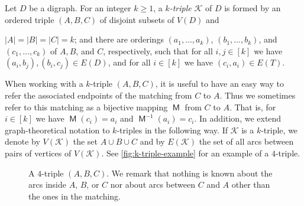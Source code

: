 \documentclass[a4paper,UKenglish,cleveref, autoref, thm-restate]{lipics-v2021}
\DeclareMathOperator{\Mat}{\mathsf M}
\begin{document}
\begin{definition}[$k$-triple]\label{def:k-triple}
  Let $D$ be a digraph. For an integer $k \geq 1$, a \emph{$k$-triple} $\mathcal{K}$ of $D$ is formed by an
  ordered triple $(A, B, C)$  of disjoint subsets of $V(D)$ and
  \begin{outline}
    \1 $|A| = |B| = |C| = k$; and
    \1  there are orderings $(a_1, \ldots, a_k)$, $(b_1, \ldots, b_k)$, and $(c_1,
    \ldots, c_k)$ of $A,B$, and $C$, respectively, such that
    \2 for all  $i,j \in [k]$ we have $(a_i,b_j), (b_i,c_j) \in E(D)$, and
    \2 for all $i \in [k]$ we have $(c_i, a_i) \in E(T)$.
  \end{outline}
\end{definition}
When working with a $k$-triple $(A,B,C)$,  it is useful to have an easy way
to refer the associated endpoints of the matching from $C$ to $A$.
Thus we sometimes refer to this matching as a bijective mapping $\Mat$ from $C$
to $A$.
That is, for $i \in [k]$ we have $\Mat(c_i) = a_i$ and $\Mat^{-1}(a_i) = c_i$.
In addition, we extend graph-theoretical notation to $k$-triples in the
following way.
If $\mathcal{K}$ is a $k$-triple, we denote by $V(\mathcal{K})$ the set $A \cup
B \cup C$ and by $E(\mathcal{K})$ the set of all arcs between pairs of
vertices of $V(\mathcal{K})$.
See \autoref{fig:k-triple-example} for an example of a $4$-triple.

\begin{figure}[h]
  \centering
  \caption{A $4$-triple $(A, B, C)$. We remark that nothing is known about the arcs
  inside $A$, $B$, or $C$ nor about arcs between $C$ and $A$ other than the ones in the matching.}
  \label{fig:k-triple-example}
\end{figure}
\end{document}

